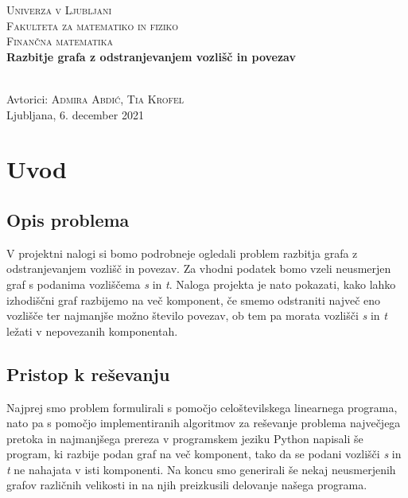 \documentclass[a4paper,12pt]{article}
\theoremstyle{definition}
\begin{document}
\begin{titlepage}
	
	\center
		\textsc{\large Univerza v Ljubljani}\\
		\textsc{\large Fakulteta za matematiko in fiziko}\\	
		\textsc{\large Finančna matematika}\\[6cm]	
			
		\Large
		\textbf{Razbitje grafa z odstranjevanjem vozlišč in povezav}\\[1cm]
		\large
		\\[8cm] 
		\large 
		
		\large Avtorici:
		\textsc{Admira Abdić, Tia Krofel}\\	
		{\large Ljubljana, 6. december 2021}\\[1cm]
		
		\vfill
	
\end{titlepage}
	

\pagebreak

\section{Uvod}

\subsection{Opis problema}
V projektni nalogi si bomo podrobneje ogledali 
problem razbitja grafa z odstranjevanjem vozlišč in povezav. 
Za vhodni podatek bomo vzeli neusmerjen graf s podanima
vozliščema \emph{s} in \emph{t}.
Naloga projekta je nato pokazati, kako lahko izhodiščni graf 
razbijemo na več komponent, če smemo odstraniti največ eno vozlišče 
ter najmanjše možno število povezav, ob tem pa morata  
vozlišči \emph{s} in \emph{t} ležati v nepovezanih komponentah.

\subsection{Pristop k reševanju}
Najprej smo problem formulirali s pomočjo celoštevilskega linearnega programa,
nato pa s pomočjo implementiranih algoritmov za reševanje problema 
največjega pretoka in najmanjšega prereza v programskem jeziku Python
napisali še program, ki razbije podan graf na več komponent, tako da 
se podani vozlišči \emph{s} in \emph{t} ne nahajata v isti komponenti.
Na koncu smo generirali še nekaj neusmerjenih grafov različnih velikosti 
in na njih preizkusili delovanje našega programa.
\end{document}
